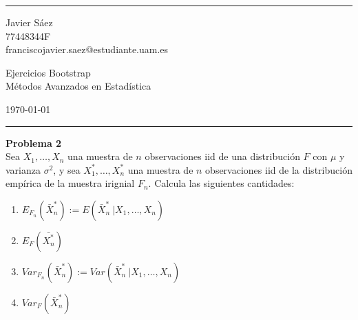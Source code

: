 \documentclass[a4paper]{article}
\newenvironment{problem}[2][Problema]
    { \begin{mdframed}[backgroundcolor=gray!20] \textbf{#1 #2} \\}
    {  \end{mdframed}}
\begin{document}

\fancyhead[C]{}
\hrule \medskip %
\begin{minipage}{0.295\textwidth}
\raggedright
\footnotesize
Javier Sáez \hfill\\
77448344F \hfill\\
franciscojavier.saez@estudiante.uam.es
\end{minipage}
\begin{minipage}{0.4\textwidth}
\centering
\large
Ejercicios Bootstrap\\
\normalsize
Métodos Avanzados en Estadística\\
\end{minipage}
\begin{minipage}{0.295\textwidth}
\raggedleft
\today\hfill\\
\end{minipage}
\medskip\hrule
\bigskip






\begin{problem}{2}
  Sea \( X_1,\dots,X_n\) una muestra de \(n\) observaciones iid de una distribución \(F\) con \(\mu\) y varianza \(\sigma^2\), y sea \(X_1^*,\dots,X_n^*\) una muestra de \(n\) observaciones iid de la distribución empírica de la muestra irignial \(F_n\). Calcula las siguientes cantidades:

  \begin{enumerate}
  \item \(E_{F_n}( \bar X_n^* ):= E(\bar X_n^* \ | X_1,\dots,X_n)\)
  \item \(E_F(\bar{X_n^*})\)
  \item \(Var_{F_n}\left(\bar X_n^*\right) := Var(\bar X_n^* \ | X_1,\dots, X_n)\)
  \item \(Var_F(\bar X_n^*)\)


    \end{enumerate}
  \end{problem}
\end{document}
